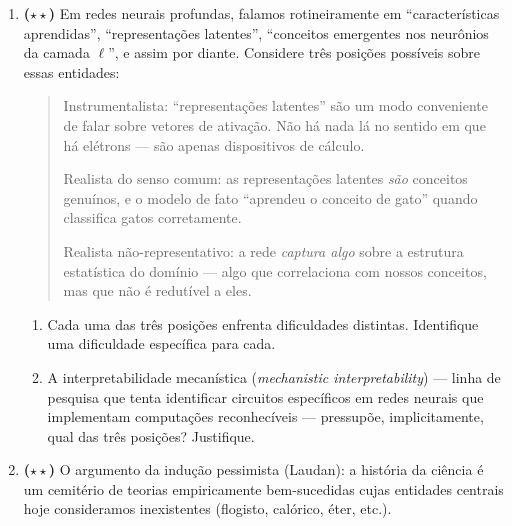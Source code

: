 \documentclass[10pt,a4paper]{extarticle}
\newcommand{\impt}[1]{\textcolor{important}{#1}}
\newcommand{\difii}{$\star\star$}
\begin{document}
\begin{enumerate}[label=\textbf{\arabic*.}, leftmargin=*, start=26]

\item \textbf{(\difii)} Em redes neurais profundas, falamos rotineiramente em ``características aprendidas'', ``representações latentes'', ``conceitos emergentes nos neurônios da camada $\ell$'', e assim por diante. Considere três posições possíveis sobre essas entidades:

\begin{quote}
\impt{Instrumentalista:} ``representações latentes'' são um modo conveniente de falar sobre vetores de ativação. Não há nada lá no sentido em que há elétrons --- são apenas dispositivos de cálculo.

\impt{Realista do senso comum:} as representações latentes \emph{são} conceitos genuínos, e o modelo de fato ``aprendeu o conceito de gato'' quando classifica gatos corretamente.

\impt{Realista não-representativo:} a rede \emph{captura algo} sobre a estrutura estatística do domínio --- algo que correlaciona com nossos conceitos, mas que não é redutível a eles.
\end{quote}

\begin{enumerate}[label=(\alph*)]
    \item Cada uma das três posições enfrenta dificuldades distintas. Identifique uma dificuldade específica para cada.
    \item A \impt{interpretabilidade mecanística} (\emph{mechanistic interpretability}) --- linha de pesquisa que tenta identificar circuitos específicos em redes neurais que implementam computações reconhecíveis --- pressupõe, implicitamente, qual das três posições? Justifique.
\end{enumerate}

\item \textbf{(\difii)} O argumento da \impt{indução pessimista} (Laudan): a história da ciência é um cemitério de teorias empiricamente bem-sucedidas cujas entidades centrais hoje consideramos inexistentes (flogisto, calórico, éter, etc.).


\end{enumerate}
\end{document}
